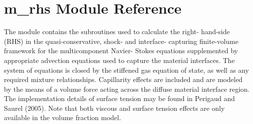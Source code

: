 \hypertarget{namespacem__rhs}{}\section{m\+\_\+rhs Module Reference}
\label{namespacem__rhs}


The module contains the subroutines used to calculate the right-\/ hand-\/side (R\+HS) in the quasi-\/conservative, shock-\/ and interface-\/ capturing finite-\/volume framework for the multicomponent Navier-\/ Stokes equations supplemented by appropriate advection equations used to capture the material interfaces. The system of equations is closed by the stiffened gas equation of state, as well as any required mixture relationships. Capillarity effects are included and are modeled by the means of a volume force acting across the diffuse material interface region. The implementation details of surface tension may be found in Perigaud and Saurel (2005). Note that both viscous and surface tension effects are only available in the volume fraction model.  


